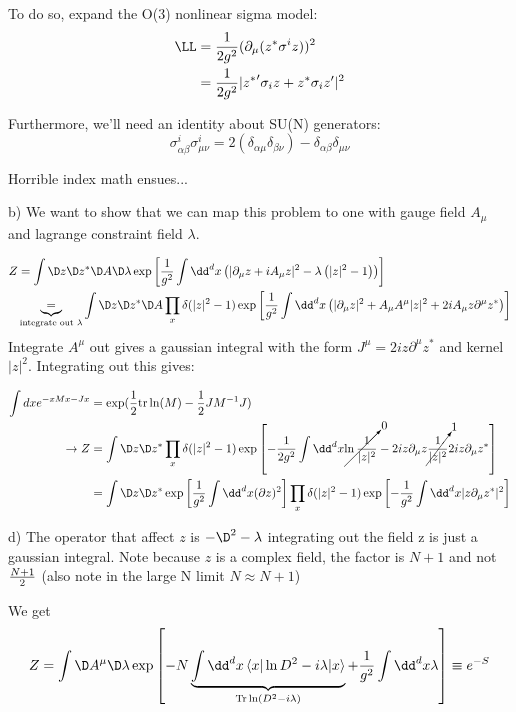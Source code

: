 \documentclass[9pt]{scrartcl}
\begin{document}
To do so, expand the O(3) nonlinear sigma model:
\begin{align}
	\LL &= {1 \over 2 g^2} (\partial_\mu  (z^* \sigma^i z))^2 \\
	& = {1 \over 2 g^2} |{z^*}' \sigma_i z + z^* \sigma_i z'|^2
\end{align}

Furthermore, we'll need an identity about SU(N) generators:
\[ \sigma^{i}_{\alpha \beta} \sigma^{i}_{\mu \nu} = 2 (\delta_{\alpha \mu} \delta_{\beta \nu}) - \delta_{\alpha \beta} \delta_{\mu \nu}\]

Horrible index math ensues...

b) We want to show that we can map this problem to one with gauge field $A_\mu$ and lagrange constraint field $\lambda$.

\begin{align}
	Z & = \int \D z \D z^* \D A \D \lambda \exp \left[{1 \over g^2} \int \dd^d x \left(|\partial_\mu z + i A_\mu z|^2 -  \lambda \left(|z|^2 - 1 \right) \right) \right] \\
	& \underbrace{=}_{\text{integrate out } \lambda}  \int \D z \D z^* \D A \prod_x \delta(|z|^2 -1) \exp \left[{1 \over g^2} \int \dd^d x \left(|\partial_\mu z|^2 + A_\mu A^{\mu} |z|^2 + 2 i A_\mu z \partial^{\mu} z^* \right) \right] 
\end{align}
Integrate $A^\mu$ out gives a gaussian integral with the form $J^\mu = 2 i z \partial^\mu z^*$ and kernel $|z|^2$.  Integrating out this gives:


\begin{align}
	\int dx e^{- x M x - J x} &= \exp(\frac12 \mathrm{tr} \ln(M) - \frac12 J M^{-1} J) \\
	\rightarrow Z &=  \int \D z \D z^* \prod_x \delta(|z|^2 -1) \exp \left[ -{1 \over 2 g^2} \int \dd^d x \cancelto{0}{\ln{ 1 \over |z|^2}} - 2 i z \partial_\mu z \cancelto{1}{1 \over |z|^2} 2 i z \partial_\mu z^* \right] \\
	&=  \int \D z \D z^* \exp \left[{1 \over g^2} \int \dd^d x (\partial z)^2 \right] \prod_x \delta(|z|^2 -1) \exp \left[-{1 \over g^2} \int \dd^d x |z \partial_\mu z^*|^2 \right]
\end{align}

d)  The operator that affect $z$ is $-\D^2 - \lambda$  integrating out the field z is just a gaussian integral.  Note because $z$ is a complex field, the factor is $N+1$ and not ${N+1 \over 2}$ (also note in the large N limit $N \approx N+1$)

We get
\begin{align}
	Z = \int \D A^\mu \D \lambda \exp \left[ - {N} \underbrace{\int \dd^d x \braket{x| \ln {D^2 - i \lambda}|x}}_{\mathrm{Tr} \ln (D^2 - i\lambda)}  + {1 \over g^2} \int \dd^d x \lambda \right] \equiv e^{-S}
	\end{align}
\end{document}
